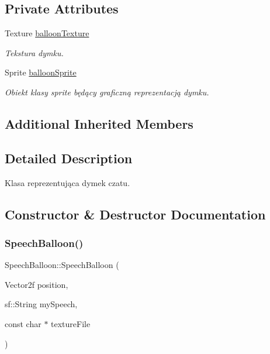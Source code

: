 \subsection*{Private Attributes}
\begin{DoxyCompactItemize}
\item 
\mbox{\label{class_speech_balloon_a4061d91b21a43be80f77c5667e10291b}} 
Texture \mbox{\hyperlink{class_speech_balloon_a4061d91b21a43be80f77c5667e10291b}{balloon\+Texture}}
\begin{DoxyCompactList}\small\item\em Tekstura dymku. \end{DoxyCompactList}\item 
\mbox{\label{class_speech_balloon_ad6061cd595ce62e2a6adb2db347cead5}} 
Sprite \mbox{\hyperlink{class_speech_balloon_ad6061cd595ce62e2a6adb2db347cead5}{balloon\+Sprite}}
\begin{DoxyCompactList}\small\item\em Obiekt klasy sprite będący graficzną reprezentacją dymku. \end{DoxyCompactList}\end{DoxyCompactItemize}
\subsection*{Additional Inherited Members}


\subsection{Detailed Description}
Klasa reprezentująca dymek czatu. 

\subsection{Constructor \& Destructor Documentation}
\mbox{\label{class_speech_balloon_a072b0566250dac05537d0567e5bd0796}} 
\subsubsection{\texorpdfstring{SpeechBalloon()}{SpeechBalloon()}}
{\footnotesize\ttfamily Speech\+Balloon\+::\+Speech\+Balloon (\begin{DoxyParamCaption}\item[{Vector2f}]{position,  }\item[{sf\+::\+String}]{my\+Speech,  }\item[{const char $\ast$}]{texture\+File }\end{DoxyParamCaption})}




